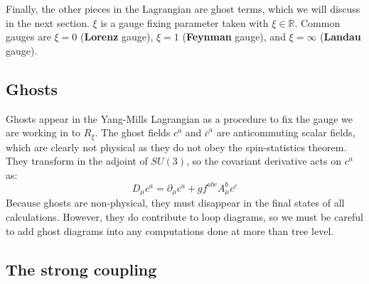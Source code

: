 \documentclass[11pt, oneside]{article}   	%
\theoremstyle{definition}
\numberwithin{equation}{subsection}		%
\begin{document}
Finally, the other pieces in the Lagrangian are ghost terms, which we will discuss in the next section. $\xi$ is a gauge fixing 
parameter taken with $\xi\in\mathbb R$. Common gauges are $\xi = 0$ (\textbf{Lorenz} gauge), $\xi = 1$ (\textbf{Feynman} gauge), and 
$\xi = \infty$ (\textbf{Landau} gauge). 

\subsection{Ghosts}

Ghosts appear in the Yang-Mills Lagrangian as a procedure to fix the gauge we are working in to $R_\xi$. The ghost fields 
$c^a$ and $\overline c^a$ are anticommuting scalar fields, which are clearly not physical as they do not obey the spin-statistics 
theorem. They transform in the adjoint of $SU(3)$, so the covariant derivative acts on $c^a$ as:
\begin{equation}
	D_\mu c^a = \partial_\mu c^a + g f^{abc} A_\mu^b c^c
\end{equation}
Because ghosts are non-physical, they must disappear in the final states of all calculations. However, they do contribute
to loop diagrams, so we must be careful to add ghost diagrams into any computations done at more than tree level.



\subsection{The strong coupling}
\end{document}
